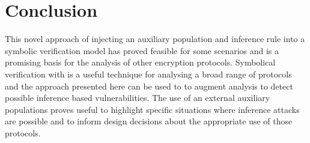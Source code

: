 \documentclass[journal]{IEEEtran}
\begin{document}



\section{Conclusion}
This novel approach of injecting an auxiliary population and inference rule into a symbolic verification model has proved feasible for some scenarios and is a promising basis for the analysis of other encryption protocols.	Symbolical verification with \tamarin{} is a useful technique for analysing a broad range of protocols and the approach presented here can be used to to augment analysis to detect possible inference based vulnerabilities. The use of an external auxiliary populations proves useful to highlight specific situations where inference attacks are possible and to inform design decisions about the appropriate use of those protocols.



%
\end{document}
